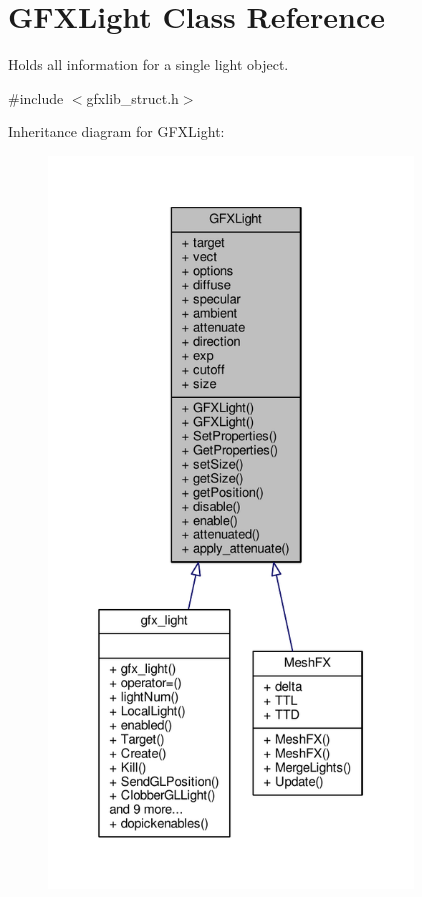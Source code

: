\hypertarget{classGFXLight}{}\section{G\+F\+X\+Light Class Reference}
\label{classGFXLight}


Holds all information for a single light object.  




{\ttfamily \#include $<$gfxlib\+\_\+struct.\+h$>$}



Inheritance diagram for G\+F\+X\+Light\+:
\nopagebreak
\begin{figure}[H]
\begin{center}
\leavevmode
\includegraphics[height=550pt]{dc/d1c/classGFXLight__inherit__graph}
\end{center}
\end{figure}


